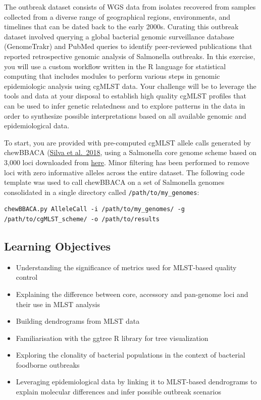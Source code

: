 \documentclass[
]{book}
\providecommand{\tightlist}{%
  \setlength{\itemsep}{0pt}\setlength{\parskip}{0pt}}
\begin{document}
The outbreak dataset consists of WGS data from isolates recovered from samples collected from a diverse range of geographical regions, environments, and timelines that can be dated back to the early 2000s. Curating this outbreak dataset involved querying a global bacterial genomic surveillance database (GenomeTrakr) and PubMed queries to identify peer-reviewed publications that reported retrospective genomic analysis of Salmonella outbreaks. In this exercise, you will use a custom workflow written in the R language for statistical computing that includes modules to perform various steps in genomic epidemiologic analysis using cgMLST data. Your challenge will be to leverage the tools and data at your disposal to establish high quality cgMLST profiles that can be used to infer genetic relatedness and to explore patterns in the data in order to synthesize possible interpretations based on all available genomic and epidemiological data.

To start, you are provided with pre-computed cgMLST allele calls generated by chewBBACA (\href{https://pubmed.ncbi.nlm.nih.gov/29543149/}{Silva et al.~2018}, using a Salmonella core genome scheme based on 3,000 loci downloaded from \href{https://zenodo.org/record/4724927}{here}. Minor filtering has been performed to remove loci with zero informative alleles across the entire dataset. The following code template was used to call chewBBACA on a set of Salmonella genomes consolidated in a single directory called \texttt{/path/to/my\_genomes}:

\begin{verbatim}
chewBBACA.py AlleleCall -i /path/to/my_genomes/ -g /path/to/cgMLST_scheme/ -o /path/to/results
\end{verbatim}

\subsection{Learning Objectives}\label{learning-objectives}

\begin{itemize}
\tightlist
\item
  Understanding the significance of metrics used for MLST-based quality control
\item
  Explaining the difference between core, accessory and pan-genome loci and their use in MLST analysis
\item
  Building dendrograms from MLST data
\item
  Familiarisation with the ggtree R library for tree visualization
\item
  Exploring the clonality of bacterial populations in the context of bacterial foodborne outbreaks
\item
  Leveraging epidemiological data by linking it to MLST-based dendrograms to explain molecular differences and infer possible outbreak scenarios
\end{itemize}
\end{document}
